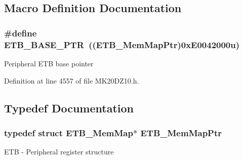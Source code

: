 \subsection{Macro Definition Documentation}
\subsubsection[{\texorpdfstring{E\+T\+B\+\_\+\+B\+A\+S\+E\+\_\+\+P\+TR}{ETB_BASE_PTR}}]{\setlength{\rightskip}{0pt plus 5cm}\#define E\+T\+B\+\_\+\+B\+A\+S\+E\+\_\+\+P\+TR~(({\bf E\+T\+B\+\_\+\+Mem\+Map\+Ptr})0x\+E0042000u)}\hypertarget{group___e_t_b___peripheral_gaaefe9b614cb5542a69cb7461307f1267}{}\label{group___e_t_b___peripheral_gaaefe9b614cb5542a69cb7461307f1267}
Peripheral E\+TB base pointer 

Definition at line 4557 of file M\+K20\+D\+Z10.\+h.



\subsection{Typedef Documentation}
\subsubsection[{\texorpdfstring{E\+T\+B\+\_\+\+Mem\+Map\+Ptr}{ETB_MemMapPtr}}]{\setlength{\rightskip}{0pt plus 5cm}typedef struct {\bf E\+T\+B\+\_\+\+Mem\+Map}$\ast$ {\bf E\+T\+B\+\_\+\+Mem\+Map\+Ptr}}\hypertarget{group___e_t_b___peripheral_ga8b44c770780865d622e8799d88981d9e}{}\label{group___e_t_b___peripheral_ga8b44c770780865d622e8799d88981d9e}
E\+TB -\/ Peripheral register structure 